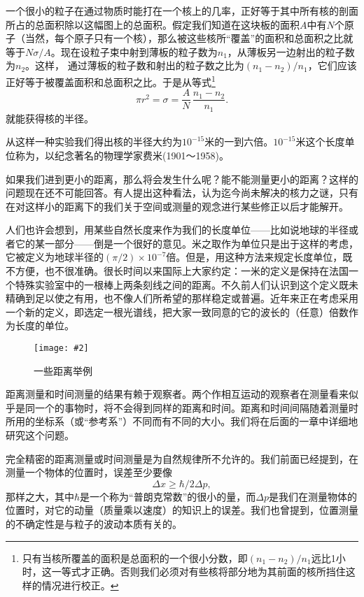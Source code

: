 \documentclass[12pt,oneside]{book}
\newenvironment{fig}[2][1]
{\begin{figure}[H]
\centering
\texttt{[image: \#2]}}
{\end{figure}}
\begin{document}
一个很小的粒子在通过物质时能打在一个核上的几率，正好等于其中所有核的剖面所占的总面积除以这幅图上的总面积。假定我们知道在这块板的面积$A$中有$N$个原子（当然，每个原子只有一个核），那么被这些核所“覆盖”的面积和总面积之比就等于$N \sigma / A$。现在设粒子束中射到薄板的粒子数为$n_1$，从薄板另一边射出的粒子数为$n_2$。这样， 通过薄板的粒子数和射出的粒子数之比为$(n_1-n_2)/n_1$，它们应该正好等于被覆盖面积和总面积之比。于是从等式\footnote{只有当核所覆盖的面积是总面积的一个很小分数，即$(n_1-n_2)/n_1$远比1小时，这一等式才正确。否则我们必须对有些核将部分地为其前面的核所挡住这样的情况进行校正。}
\begin{equation*}
\pi r^2=\sigma=\frac{A}{N}\,
\frac{n_1-n_2}{n_1}.
\end{equation*}
就能获得核的半径。

从这样一种实验我们得出核的半径大约为$10^{-15}$米的一到六倍。$10^{-15}$米这个长度单位称为，以纪念著名的物理学家费米(1901～1958)。

如果我们进到更小的距离，那么将会发生什么呢？能不能测量更小的距离？这样的问题现在还不可能回答。有人提出这种看法，认为迄今尚未解决的核力之谜，只有在对这样小的距离下的我们关于空间或测量的观念进行某些修正以后才能解开。

人们也许会想到，用某些自然长度来作为我们的长度单位——比如说地球的半径或者它的某一部分——倒是一个很好的意见。米之取作为单位只是出于这样的考虑，它被定义为地球半径的$(\pi/2)\times10^{-7}$倍。但是，用这种方法来规定长度单位，既不方便，也不很准确。很长时间以来国际上大家约定：一米的定义是保持在法国一个特殊实验室中的一根棒上两条刻线之间的距离。不久前人们认识到这个定义既未精确到足以使之有用，也不像人们所希望的那样稳定或普遍。近年来正在考虑采用一个新的定义，即选定一根光谱线，把大家一致同意的它的波长的（任意）倍数作为长度的单位。


\begin{fig}{一些距离举例}
\caption{一些距离举例}
\label{fig:一些距离举例}
\end{fig}

\noindent\dotfill

距离测量和时间测量的结果有赖于观察者。两个作相互运动的观察者在测量看来似乎是同一个的事物时，将不会得到同样的距离和时间。距离和时间间隔随着测量时所用的坐标系（或“参考系”）不同而有不同的大小。我们将在后面的一章中详细地研究这个问题。

完全精密的距离测量或时间测量是为自然规律所不允许的。我们前面已经提到，在测量一个物体的位置时，误差至少要像
\begin{equation*}
\Delta x\geq\hbar/2\Delta p,
\end{equation*}
那样之大，其中$\hbar$是一个称为“普朗克常数”的很小的量，而$\Delta p$是我们在测量物体的位置时，对它的动量（质量乘以速度）的知识上的误差。我们也曾提到，位置测量的不确定性是与粒子的波动本质有关的。
\end{document}
